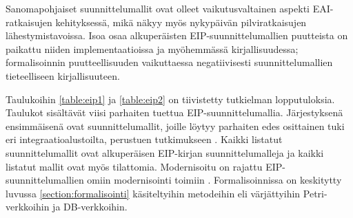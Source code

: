 Sanomapohjaiset suunnittelumallit ovat olleet vaikutusvaltainen aspekti EAI-ratkaisujen kehityksessä, mikä näkyy myös nykypäivän pilviratkaisujen lähestymistavoissa. Isoa osaa alkuperäisten EIP-suunnittelumallien puutteista on paikattu niiden implementaatioissa ja myöhemmässä kirjallisuudessa; formalisoinnin puutteellisuuden vaikuttaessa negatiivisesti suunnittelumallien tieteelliseen kirjallisuuteen.


Taulukoihin \ref{table:eip1} ja \ref{table:eip2} on tiivistetty tutkielman lopputuloksia. Taulukot sisältävät viisi parhaiten tuettua EIP-suunnittelumallia. Järjestyksenä ensimmäisenä ovat suunnittelumallit, joille löytyy parhaiten edes osittainen tuki eri integraatioalustoilta, perustuen tutkimukseen \citep{Ritter2017}.
Kaikki listatut suunnittelumallit ovat alkuperäisen EIP-kirjan \citep{Hohpe2004} suunnittelumalleja ja kaikki listatut mallit ovat myös tilattomia.
Modernisoitu on rajattu EIP-suunnittelumallien omiin modernisointi toimiin \citep{HohpeModernExamples}. Formalisoinnissa on keskitytty luvussa \ref{section:formalisointi} käsiteltyihin metodeihin eli värjättyihin Petri-verkkoihin ja DB-verkkoihin.

